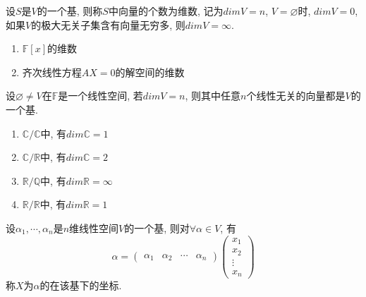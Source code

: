 \begin{definition}[线性空间的维数]
    设$S$是$V$的一个基, 则称$S$中向量的个数为维数, 记为$dimV=n$, $V = \varnothing$时, $dimV=0$, 如果$V$的极大无关子集含有向量无穷多, 则$dimV=\infty$.
\end{definition}

\begin{example}
    \par
    \begin{enumerate}[itemindent=1em]
        \item $\mathbb{F}[x]$的维数
        \item 齐次线性方程$AX=0$的解空间的维数
    \end{enumerate}
\end{example}

\begin{inference}
    设$\varnothing \ne V$在$\mathbb{F}$是一个线性空间, 若$dimV=n$, 则其中任意$n$个线性无关的向量都是$V$的一个基.
\end{inference}

\begin{example}
    \par
    \begin{enumerate}[itemindent=1em]
        \item $\mathbb{C}/\mathbb{C}$中, 有$dim\mathbb{C}=1$
        \item $\mathbb{C}/\mathbb{R}$中, 有$dim\mathbb{C}=2$
        \item $\mathbb{R}/\mathbb{Q}$中, 有$dim\mathbb{R}=\infty$
        \item $\mathbb{R}/\mathbb{R}$中, 有$dim\mathbb{R}=1$
    \end{enumerate}
\end{example}

\begin{definition}[坐标]
    设$\alpha{_1}, \cdots, \alpha{_n}$是$n$维线性空间$V$的一个基, 则对$\forall \alpha \in V$, 有
    \[\alpha = \begin{pmatrix}
        \alpha{_1} & \alpha{_2} & \cdots & \alpha{_n}
    \end{pmatrix} \begin{pmatrix}
        x_1 \\
        x_2 \\
        \vdots \\
        x_n
    \end{pmatrix}\]
    称$X$为$\alpha$的在该基下的坐标.
\end{definition}

